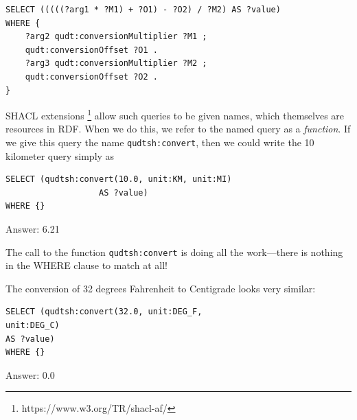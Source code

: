 \begin{lstlisting}
SELECT (((((?arg1 * ?M1) + ?O1) - ?O2) / ?M2) AS ?value)
WHERE {
    ?arg2 qudt:conversionMultiplier ?M1 ;
    qudt:conversionOffset ?O1 .
    ?arg3 qudt:conversionMultiplier ?M2 ;
    qudt:conversionOffset ?O2 .
}
\end{lstlisting}


SHACL extensions \footnote{https://www.w3.org/TR/shacl-af/} allow such queries to be given names, which themselves are
resources in RDF.   When we do this, we refer to the named query 
as a \emph{function}.  If we give this query the 
name \texttt{qudtsh:convert}, then
we could write the 10 kilometer query simply as

\begin{query}
\begin{lstlisting}
SELECT (qudtsh:convert(10.0, unit:KM, unit:MI)
                   AS ?value)
WHERE {}
\end{lstlisting}
\end{query}

Answer: 6.21

The call to the function \texttt{qudtsh:convert} is doing all the work---there is
nothing in the
WHERE clause to match at all!

The conversion of 32 degrees Fahrenheit to Centigrade looks very
similar:

\begin{lstlisting}
SELECT (qudtsh:convert(32.0, unit:DEG_F,
unit:DEG_C)
AS ?value)
WHERE {}
\end{lstlisting}


Answer: 0.0


